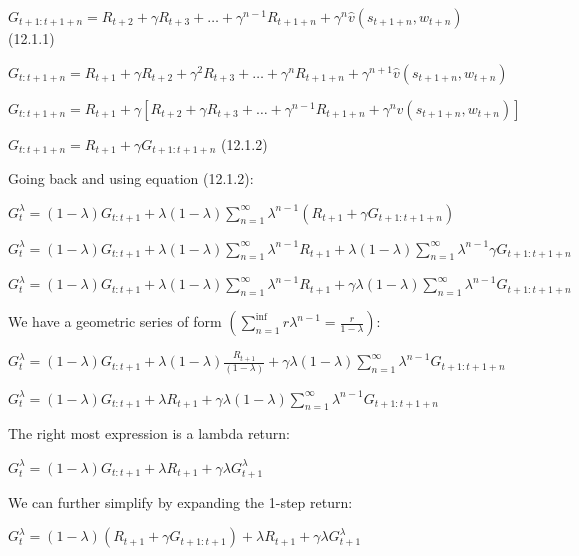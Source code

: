 \documentclass[11pt]{article}
\begin{document}
    \noindent $ G_{t+1:t+1+n} =  R_{t+2} + \gamma R_{t+3} + \ldots + \gamma^{n-1} R_{t+1+n} + \gamma^n \hat{v}(s_{t+1+n},w_{t+n})  $ (12.1.1)

    \noindent $ G_{t:t+1+n} =  R_{t+1} + \gamma R_{t+2} + \gamma^2 R_{t+3} + \ldots + \gamma^{n} R_{t+1+n} + \gamma^{n+1} \hat{v}(s_{t+1+n},w_{t+n})  $

    \noindent $ G_{t:t+1+n} =  R_{t+1} + \gamma [R_{t+2} + \gamma R_{t+3} + \ldots + \gamma^{n-1} R_{t+1+n} + \gamma^{n} \hat{v}(s_{t+1+n},w_{t+n})]  $

    \noindent $ G_{t:t+1+n} =  R_{t+1} + \gamma G_{t+1:t+1+n}  $ (12.1.2)

    \hfill \break
    \noindent Going back and using equation (12.1.2):

    \noindent $ G_{t}^\lambda = (1-\lambda) G_{t:t+1} +  \lambda (1-\lambda) \sum_{n=1}^{\infty} \lambda^{n-1} (R_{t+1} + \gamma G_{t+1:t+1+n}) $

    \noindent $ G_{t}^\lambda = (1-\lambda) G_{t:t+1} +  \lambda (1-\lambda) \sum_{n=1}^{\infty} \lambda^{n-1} R_{t+1 }+   \lambda (1-\lambda) \sum_{n=1}^{\infty} \lambda^{n-1} \gamma G_{t+1:t+1+n} $

    \noindent $ G_{t}^\lambda = (1-\lambda) G_{t:t+1} +  \lambda (1-\lambda) \sum_{n=1}^{\infty} \lambda^{n-1} R_{t+1 }+   \gamma \lambda (1-\lambda) \sum_{n=1}^{\infty} \lambda^{n-1}  G_{t+1:t+1+n} $

    \hfill \break
    \noindent We have a geometric series of form $ ( \sum_{n=1}^{\inf} r \lambda^{n-1} = \frac{r}{1-\lambda} ) $:

    \noindent $ G_{t}^\lambda = (1-\lambda) G_{t:t+1} +  \lambda (1-\lambda)  \frac{R_{t+1}}{(1-\lambda)} +  \gamma \lambda (1-\lambda) \sum_{n=1}^{\infty} \lambda^{n-1} G_{t+1:t+1+n} $

    \noindent $ G_{t}^\lambda = (1-\lambda) G_{t:t+1} +  \lambda R_{t+1} +  \gamma \lambda (1-\lambda) \sum_{n=1}^{\infty} \lambda^{n-1} G_{t+1:t+1+n} $

    \hfill \break
    \noindent The right most expression is a lambda return:

    \noindent $ G_{t}^\lambda = (1-\lambda) G_{t:t+1} +  \lambda R_{t+1} +  \gamma \lambda G_{t+1}^\lambda $

    \hfill \break
    \noindent We can further simplify by expanding the 1-step return:

    \noindent $ G_{t}^\lambda = (1-\lambda) (R_{t+1} + \gamma G_{t+1:t+1}) +  \lambda R_{t+1} +  \gamma \lambda G_{t+1}^\lambda $
\end{document}
